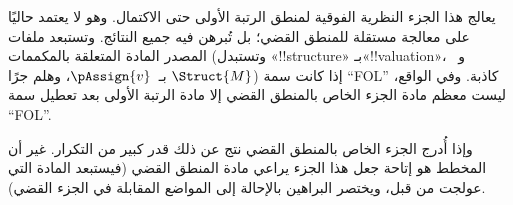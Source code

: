 \documentclass[../../include/open-logic-part]{subfiles}
\begin{document}

\begin{editorial}
  يعالج هذا الجزء النظرية الفوقية لمنطق الرتبة الأولى حتى الاكتمال.
  وهو لا يعتمد حاليًا على معالجة مستقلة للمنطق القضي؛ بل تُبرهن فيه
  جميع النتائج. وتستبعد ملفات المصدر المادة المتعلقة بالمكممات (وتستبدل
  «!!{structure}» بـ«!!{valuation}»، و~$\Struct{M}$ بـ~$\pAssign{v}$،
  وهلم جرًا) إذا كانت سمة ``FOL'' كاذبة. وفي الواقع، ليست معظم مادة
  الجزء الخاص بالمنطق القضي إلا مادة الرتبة الأولى بعد تعطيل سمة
  ``FOL''.

  وإذا أُدرج الجزء الخاص بالمنطق القضي نتج عن ذلك قدر كبير من التكرار.
  غير أن المخطط هو إتاحة جعل هذا الجزء يراعي مادة المنطق القضي (فيستبعد
  المادة التي عولجت من قبل، ويختصر البراهين بالإحالة إلى المواضع
  المقابلة في الجزء القضي).
\end{editorial}












\OLEndPartHook
\end{document}
